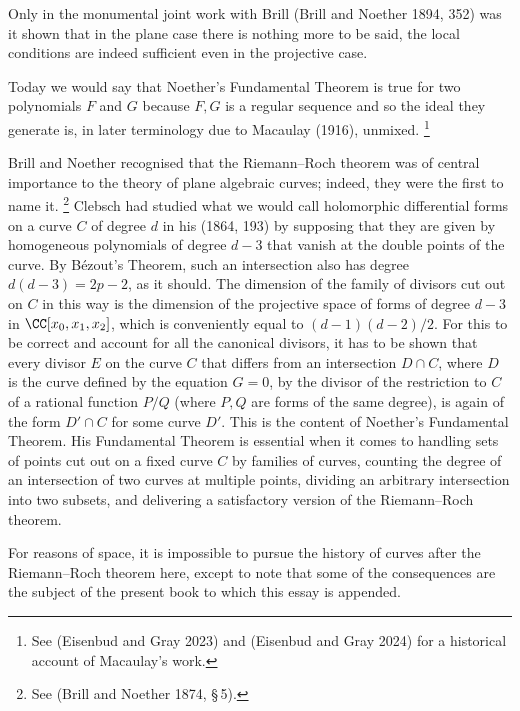 Only in the monumental joint work with Brill
%
(Brill and Noether 1894,
352) was it shown that in the plane case there is nothing more to be said,
the local conditions are indeed sufficient even in the projective case.


Today we would say that Noether's Fundamental Theorem is true for two
polynomials $F$ and $G$ because $F,G$ is a regular sequence  and so  the
ideal they generate is, in later terminology due to Macaulay (1916),
%
%
unmixed.%
%
\footnote{See (Eisenbud and Gray 2023) and (Eisenbud and Gray
2024) for a historical account of Macaulay's work.}

Brill and Noether recognised that the Riemann--Roch theorem was of
%
central importance to the theory of plane algebraic curves; indeed, they
were the first to name it.%
%
\footnote{See (Brill and Noether 1874, \S\,5).}
%
Clebsch had studied what we would call holomorphic diff\-erential forms
%
on a curve $C$  of degree $d$ in his (1864, 193)  by supposing that they
are given by homogeneous polynomials of degree $d-3$ that vanish at the
double points of the curve.
By B\'ezout's Theorem,
%
 such an intersection also has degree $d(d-3) =
2p-2$, as it should. The dimension of the family of divisors cut out
on $C$ in this way is the dimension of the projective space of forms
of degree $d-3$ in $\CC[x_0,x_1,x_2]$, which is conveniently equal to
$(d-1)(d-2)/2$. For this to be correct and account for all the canonical
divisors, it has to be shown that every divisor $E$ on the curve $C$ that
differs from an intersection $D\cap C$, where $D$ is the curve defined
by the equation $G = 0$,  by the divisor of the restriction to $C$ of
a rational function $P/Q$ (where $P, Q$ are forms of the same degree),
is again of the form $D'\cap C$ for some curve $D'$. This is the content
of Noether's Fundamental Theorem. His Fundamental Theorem is essential
%
when it comes  to handling  sets of points cut out on a fixed curve $C$ by
families of curves, counting the degree of an intersection of two curves
at multiple points,  dividing an arbitrary intersection into two subsets,
and delivering a satisfactory version of the Riemann--Roch theorem.
%

For reasons of space, it is impossible to pursue the history of curves
after the Riemann--Roch theorem here, except to note that some of the
consequences are the subject of the present book to which this essay
is appended.


